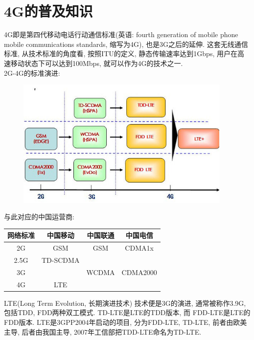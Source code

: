 \section {\ZHH 4G的普及知识} {

    {4G即是第四代移动电话行动通信标准(英语: fourth generation of mobile phone mobile communications standards, 缩写为4G), 也是3G之后的延伸. 这套无线通信标准, 从技术标准的角度看, 按照ITU的定义, 静态传输速率达到1Gbps, 用户在高速移动状态下可以达到100Mbps, 就可以作为4G的技术之一. } \\

    \vspace {6pt}
    {2G-4G的标准演进: } \\
    \begin {figure} [htbn]
        \centering
        \includegraphics [width = 300pt, keepaspectratio] {4g.jpg}
    \end {figure}

    \vspace {6pt}
    {与此对应的中国运营商: } \\
    \begin {table} [htbp]
    \centering
    \begin {tabular} {| c | c | c | c |}
        \hline
        网络标准    &   中国移动    &   中国联通    &   中国电信    \\
        \hline
        2G          &   GSM         &   GSM         &   CDMA1x      \\
        \hline
        2.5G        &   TD-SCDMA    &               &               \\
        \hline
        3G          &               &   WCDMA       &   CDMA2000    \\
        \hline
        4G          &   LTE         &               &               \\
        \hline
    \end {tabular}
    \end {table}

    \vspace {6pt}
    { {\ZHH LTE(Long Term Evolution, 长期演进技术) } 技术便是3G的演进, 通常被称作3.9G, 包括TDD, FDD两种双工模式. TD-LTE是LTE的TDD版本, 而 FDD-LTE是LTE的FDD版本. LTE是3GPP2004年启动的项目, 分为FDD-LTE, TD-LTE, 前者由欧美主导, 后者由我国主导, 2007年工信部把TDD-LTE命名为TD-LTE. } \\
}


